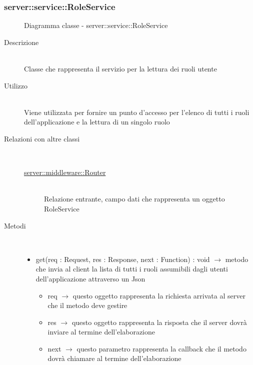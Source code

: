 \subsubsection[RoleService]{server::service::RoleService}
\begin{figure}[H]
	\centering
	\caption{Diagramma classe - server::service::RoleService}
\end{figure}\begin{description}
\item[Descrizione] \hfill \\
Classe che rappresenta il servizio per la lettura dei ruoli utente
\item[Utilizzo] \hfill \\
Viene utilizzata per fornire un punto d'accesso per l'elenco di tutti i ruoli dell'applicazione e la lettura di un singolo ruolo
\item[Relazioni con altre classi] \hfill \\
\vspace{-7mm}
\begin{description}
	\item[\hyperlink{server::middleware::Router}{server::middleware::Router}] \hfill \\
	Relazione entrante, campo dati che rappresenta un oggetto RoleService
\end{description}

\item[Metodi] \hfill \\
\vspace{-7mm}
\begin{itemize}
	\item get(req : Request, res : Response, next : Function) : void $\rightarrow$ metodo che invia al client la lista di tutti i ruoli assumibili dagli utenti dell'applicazione attraverso un Json\begin{itemize}
		\item req $\rightarrow$ questo oggetto rappresenta la richiesta arrivata al server che il metodo deve gestire
		\item res $\rightarrow$ questo oggetto rappresenta la risposta che il server dovrà inviare al termine dell'elaborazione
		\item next $\rightarrow$ questo parametro rappresenta la callback che il metodo dovrà chiamare al termine dell’elaborazione
	\end{itemize}
	

\end{itemize}
\end{description}
